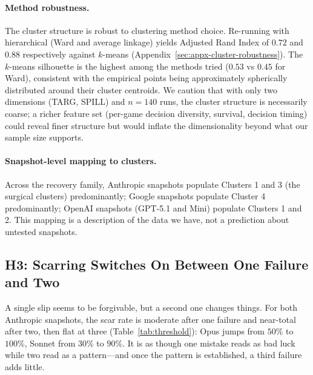 \documentclass{article}
\begin{document}
\paragraph{Method robustness.} The cluster structure is robust to clustering method choice. Re-running with hierarchical (Ward and average linkage) yields Adjusted Rand Index of $0.72$ and $0.88$ respectively against $k$-means (Appendix~\ref{sec:appx-cluster-robustness}). The $k$-means silhouette is the highest among the methods tried ($0.53$ vs $0.45$ for Ward), consistent with the empirical points being approximately spherically distributed around their cluster centroids. We caution that with only two dimensions (TARG, SPILL) and $n=140$ runs, the cluster structure is necessarily coarse; a richer feature set (per-game decision diversity, survival, decision timing) could reveal finer structure but would inflate the dimensionality beyond what our sample size supports.

\paragraph{Snapshot-level mapping to clusters.} Across the recovery family, Anthropic snapshots populate Clusters 1 and 3 (the surgical clusters) predominantly; Google snapshots populate Cluster 4 predominantly; OpenAI snapshots (GPT-5.1 and Mini) populate Clusters 1 and 2. This mapping is a description of the data we have, not a prediction about untested snapshots.

\subsection{H3: Scarring Switches On Between One Failure and Two}
\label{sec:h3}

A single slip seems to be forgivable, but a second one changes things. For both Anthropic snapshots, the scar rate is moderate after one failure and near-total after two, then flat at three (Table~\ref{tab:threshold}): Opus jumps from $50\%$ to $100\%$, Sonnet from $30\%$ to $90\%$. It is as though one mistake reads as bad luck while two read as a pattern---and once the pattern is established, a third failure adds little.
\end{document}
